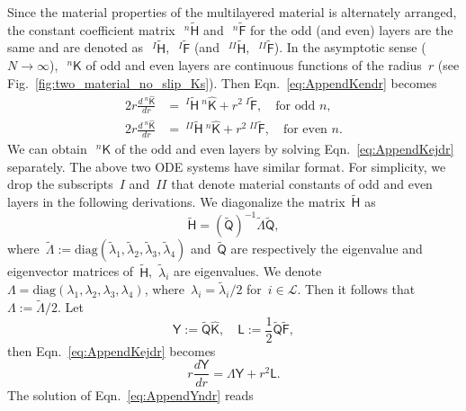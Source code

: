 \documentclass[preprint,10pt,times]{elsarticle}
\numberwithin{equation}{section}
\renewcommand{\u}[1]{\boldsymbol{#1}}
\newcommand{\usf}[1]{\u{\mathsf #1}}
\renewcommand{\>}{$\Rightarrow$}
\begin{document}
Since the material properties of the multilayered material is alternately arranged, the constant coefficient matrix~$~^{n}\tilde{\usf{H}}$ and~$~^{n}\tilde{\usf{F}}$ for the odd (and even) layers are the same and are denoted as~$~^{I}\tilde{\usf{H}}$,~$~^{I}\tilde{\usf{F}}$ (and~$~^{II}\tilde{\usf{H}}$,~$~^{II}\tilde{\usf{F}}$). In the asymptotic sense ($N \to \infty$),~$~^{n}{\usf{K}}$ of odd and even layers are continuous functions of the radius~$r$ (see Fig.~\ref{fig:two_material_no_slip_Ks}). Then Eqn.~\eqref{eq:AppendKendr} becomes
\begin{subequations}
\begin{align}
	2 r \frac{d~^{n}{\hat{\usf{K}}}}{dr} & = ~^{I}\tilde{\usf{H}} ~^{n}{\hat{\usf{K}}} + r^2 ~^{I}\tilde{\usf{F}}, \quad \text{for odd~$n$}, \\
	2 r \frac{d~^{n}{\hat{\usf{K}}}}{dr} & = ~^{II}\tilde{\usf{H}} ~^{n}{\hat{\usf{K}}} + r^2 ~^{II}\tilde{\usf{F}}, \quad \text{for even~$n$}.
\end{align}
\label{eq:AppendKejdr}
\end{subequations}
We can obtain~$~^{n}{\usf{K}}$ of the odd and even layers by solving Eqn.~\eqref{eq:AppendKejdr} separately. The above two ODE systems have similar format. For simplicity, we drop the subscripts~$I$ and~$II$ that denote material constants of odd and even layers in the following derivations. We diagonalize the matrix~$\tilde{\usf{H}}$ as
\begin{equation}
    \tilde{\usf{H}} = (\tilde{\usf{Q}})^{-1} \tilde{\usf{\Lambda}} \tilde{\usf{Q}},
\end{equation}
where~$\tilde{\usf{\Lambda}} := \text{diag}(\tilde{\lambda}_1,\tilde{\lambda}_2,\tilde{\lambda}_3,\tilde{\lambda}_4)$ and~$\tilde{\usf{Q}}$ are respectively the eigenvalue and eigenvector matrices of~$\tilde{\usf{H}}$,~$\tilde{\lambda}_i$ are eigenvalues. We denote~$\usf{\Lambda}= \text{diag}(\lambda_1,\lambda_2,\lambda_3,\lambda_4)$, where~$\lambda_i = \tilde{\lambda}_i/2$ for~$i \in \mathcal{L}$. Then it follows that~$\usf{\Lambda} := \tilde{\usf{\Lambda}}/2$.
Let
\begin{equation}
	\usf{Y} := \tilde{\usf{Q}} \hat{\usf{K}}, \quad \usf{L} := \frac{1}{2}\tilde{\usf{Q}} \tilde{\usf{F}},
\end{equation}
then Eqn.~\eqref{eq:AppendKejdr} becomes
\begin{equation}
	r \frac{d\usf{Y}}{dr} = \usf{\Lambda} \usf{Y} + r^2 \usf{L}.
	\label{eq:AppendYndr}
\end{equation}
The solution of Eqn.~\eqref{eq:AppendYndr} reads
\end{document}
